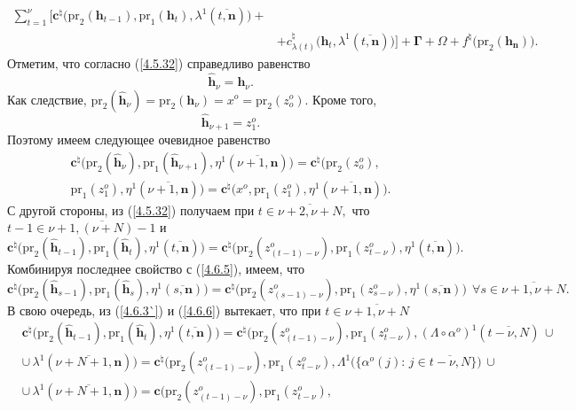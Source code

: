 \documentclass[12pt,twoside]{report}
\newcommand{\bfn}{\begin{equation}}
\newcommand{\efn}{\end{equation}}
\newcommand{\ov}{\overline}
\newcommand{\La}{\Lambda}
\newcommand{\la}{\lambda}
\newcommand{\al}{\alpha}
\newcommand{\fa}{\forall}
\newcommand{\zc}{{\mathbf c}}
\newcommand{\nn}{{\mathbf n}}
\begin{document}
{{\begin{eqnarray}
\sum\limits_{t=1}^\nu \bigl[\zc^\natural\bigl(\mathrm{pr}_2(\mathbf{h}_{t-1}),\mathrm{pr}_1(\mathbf{h}_t),
\la^1(\ov{t,\nn})\bigl) +
&\nonumber\\
&+c_{\la(t)}^\natural\bigl(\mathbf{h}_t,\la^1(\ov{t,\nn})\bigl)\bigl] +\mathbf{\Gamma} +
\Omega + f^\natural\bigl(\mathrm{pr}_2(\mathbf{h}_\nn)\bigl).
&\label{4.6.5``}
\end{eqnarray}
Отметим, что согласно (\ref{4.5.32}) справедливо равенство
$$
\hat{\mathbf{h}}_\nu = \mathbf{h}_\nu.
$$
Как следствие, $\mathrm{pr}_2(\hat{\mathbf{h}}_\nu) = \mathrm{pr}_2(\mathbf{h}_\nu) = x^o = \mathrm{pr}_2(z_o^o).$ Кроме того,
$$
\hat{\mathbf{h}}_{\nu+1} = z_1^o.
$$
Поэтому имеем следующее очевидное равенство
\begin{eqnarray}
&\zc^\natural\bigl(\mathrm{pr}_2(\hat{\mathbf{h}}_\nu),\mathrm{pr}_1
(\hat{\mathbf{h}}_{\nu+1}),\eta^1(\ov{\nu+1,\nn})\bigl)= \zc^\natural\bigl(\mathrm{pr}_2(z_o^o),
&\nonumber\\
&\mathrm{pr}_1 (z_1^o),\eta^1(\ov{\nu+1,\nn})\bigl)= \zc^\natural\bigl(x^o,\mathrm{pr}_1(z_1^o),
\eta^1(\ov{\nu+1,\nn})\bigl).
&\label{4.6.5}
\end{eqnarray}
С другой стороны, из (\ref{4.5.32}) получаем  при $t\in\ov{\nu+2,\nu+N},$ что $t-1 \in \ov{\nu+1,(\nu+N)- 1}$ и
$$
\zc^\natural\bigl(\mathrm{pr}_2(\hat{\mathbf{h}}_{t-1}),\mathrm{pr}_1(\hat{\mathbf{h}}_t),
\eta^1(\ov{t,\nn})\bigl) = \zc^\natural\bigl(\mathrm{pr}_2(z_{(t-1)-\nu}^o),\mathrm{pr}_1(z_{t-\nu}^o),
\eta^1(\ov{t,\nn})\bigl).
$$
Комбинируя последнее свойство с (\ref{4.6.5}), имеем, что
\bfn\label{4.6.6}
\zc^\natural\bigl(\mathrm{pr}_2(\hat{\mathbf{h}}_{s-1}),\mathrm{pr}_1
(\hat{\mathbf{h}}_s), \eta^1(\ov{s,\nn})\bigl)=
\zc^\natural\bigl(\mathrm{pr}_2(z_{(s-1)-\nu}^o),\mathrm{pr}_1(z_{s-\nu}^o),
\eta^1(\ov{s,\nn})\bigl)\ \ \fa s\in \ov{\nu+1,\nu+N}.
\efn
В свою очередь, из (\ref{4.6.3`}) и (\ref{4.6.6}) вытекает, что при $t\in\ov{\nu+1,\nu+N}$
\begin{eqnarray}
&\zc^\natural\bigl(\mathrm{pr}_2(\hat{\mathbf{h}}_{t-1}),\mathrm{pr}_1
(\hat{\mathbf{h}}_t), \eta^1(\ov{t,\nn})\bigl)=
\zc^\natural\bigl(\mathrm{pr}_2(z_{(t-1)-\nu}^o),\mathrm{pr}_1(z_{t-\nu}^o),
(\La \circ \al^o)^1(\ov{t-\nu,N})\,\cup
&\nonumber\\
&\cup\,\la^1(\ov{\nu+N+1,\nn})\bigl)=
\zc^\natural\bigl(\mathrm{pr}_2(z_{(t-1)-\nu}^o),\mathrm{pr}_1(z_{t-\nu}^o),
\La^1\bigl(\{\al^o(j):\,j\in\ov{t-\nu,N}\})\,\cup
&\nonumber\\
&\cup\,\la^1(\ov{\nu+N+1,\nn})\bigl)=
\zc\bigl(\mathrm{pr}_2(z_{(t-1)-\nu}^o),\mathrm{pr}_1(z_{t-\nu}^o),

\end{eqnarray}}}
\end{document}
